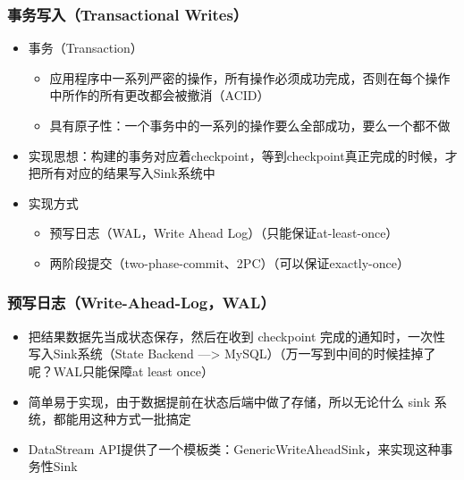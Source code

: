 \documentclass{beamer}
\begin{document}
  \begin{frame}
      \frametitle{事务写入（Transactional Writes）}
  
      \begin{itemize}
          \item 事务（Transaction）
          \begin{itemize}
              \item 应用程序中一系列严密的操作，所有操作必须成功完成，否则在每个操作中所作的所有更改都会被撤消（ACID）
              \item 具有原子性：一个事务中的一系列的操作要么全部成功，要么一个都不做
          \end{itemize}
          \item 实现思想：构建的事务对应着checkpoint，等到checkpoint真正完成的时候，才把所有对应的结果写入Sink系统中
          \item 实现方式
          \begin{itemize}
              \item 预写日志（WAL，Write Ahead Log）（只能保证at-least-once）
              \item 两阶段提交（two-phase-commit、2PC）（可以保证exactly-once）
          \end{itemize}
      \end{itemize}
  
  \end{frame}

  \begin{frame}
      \frametitle{预写日志（Write-Ahead-Log，WAL）}
  
      \begin{itemize}
          \item 把结果数据先当成状态保存，然后在收到 checkpoint 完成的通知时，一次性写入Sink系统（State Backend —> MySQL）（万一写到中间的时候挂掉了呢？WAL只能保障at least once）
          \item 简单易于实现，由于数据提前在状态后端中做了存储，所以无论什么 sink 系统，都能用这种方式一批搞定
          \item DataStream API提供了一个模板类：GenericWriteAheadSink，来实现这种事务性Sink
      \end{itemize}
  
  \end{frame}
\end{document}
